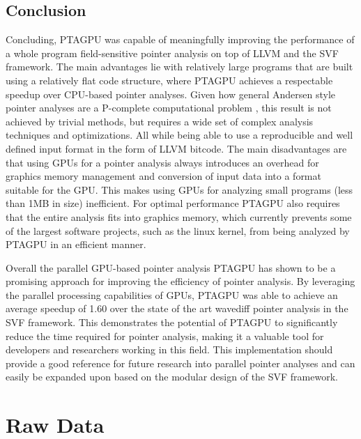 \section{Conclusion}
Concluding, PTAGPU was capable of meaningfully improving the performance of a whole program field-sensitive pointer analysis on top of LLVM and the SVF framework.
The main advantages lie with relatively large programs that are built using a relatively flat code structure, where PTAGPU achieves a respectable speedup over CPU-based pointer analyses.
Given how general Andersen style pointer analyses are a P-complete computational problem \cite{mathiasen2021fine}, this result is not achieved by trivial methods, but requires a wide set of complex analysis techniques and optimizations. All while being able to use a reproducible and well defined input format in the form of LLVM bitcode.
The main disadvantages are that using GPUs for a pointer analysis always introduces an overhead for graphics memory management and conversion of input data into a format suitable for the GPU.
This makes using GPUs for analyzing small programs (less than 1MB in size) inefficient.
For optimal performance PTAGPU also requires that the entire analysis fits into graphics memory, which currently prevents some of the largest software projects, such as the linux kernel, from being analyzed by PTAGPU in an efficient manner.

Overall the parallel GPU-based pointer analysis PTAGPU has shown to be a promising approach for improving the efficiency of pointer analysis. By leveraging the parallel processing capabilities of GPUs, PTAGPU was able to achieve an average speedup of 1.60 over the state of the art wavediff pointer analysis in the SVF framework. This demonstrates the potential of PTAGPU to significantly reduce the time required for pointer analysis, making it a valuable tool for developers and researchers working in this field.
This implementation should provide a good reference for future research into parallel pointer analyses and can easily be expanded upon based on the modular design of the SVF framework.
\appendix

\chapter{Raw Data}

